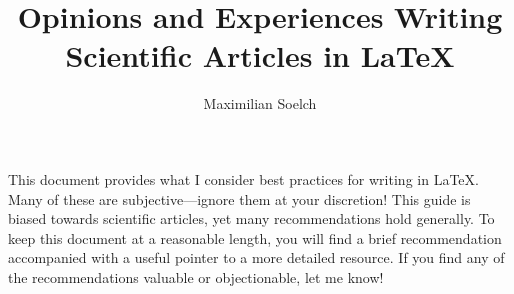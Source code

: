 \documentclass{article}
\title{Opinions and Experiences Writing Scientific Articles in \LaTeX}
\author{Maximilian Soelch}
\begin{document}
	
\maketitle

This document provides what I consider best practices for writing in \LaTeX.
Many of these are subjective---ignore them at your discretion!
This guide is biased towards scientific articles, yet many recommendations hold generally.
To keep this document at a reasonable length, you will find a brief recommendation accompanied with a useful pointer to a more detailed resource.
If you find any of the recommendations valuable or objectionable, let me know!

\tableofcontents
\vfill
\newpage












\end{document}
